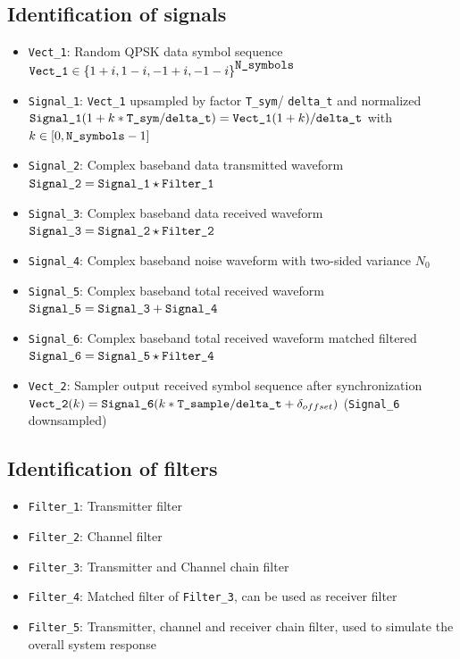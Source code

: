 \documentclass[a4paper]{article}
\begin{document}
\subsection{Identification of signals}
\begin{itemize}
  	\item \verb|Vect_1|: Random QPSK data symbol sequence\\ 
  $	\verb|Vect_1| \in {\{1+i, 1-i, -1+i, -1-i\}}^{\verb|N_symbols|} $
  	\item \verb|Signal_1|: \verb|Vect_1| upsampled by factor \verb|T_sym|/ \verb|delta_t| and normalized\\
  	$\verb|Signal_1|(1+k*\verb|T_sym|/ \verb|delta_t|)=\verb|Vect_1|(1+k)/ \verb|delta_t|$ with $k\in [0, \verb|N_symbols|-1]$
  	\item \verb|Signal_2|: Complex baseband data transmitted waveform\\
  	$\verb|Signal_2|=\verb|Signal_1|\star \verb|Filter_1|$
  	\item \verb|Signal_3|: Complex baseband data received waveform\\
  	$\verb|Signal_3|=\verb|Signal_2|\star \verb|Filter_2|$
  	\item \verb|Signal_4|: Complex baseband noise waveform with two-sided variance $N_0$ 
  	\item \verb|Signal_5|: Complex baseband total received waveform\\
  	$\verb|Signal_5|=\verb|Signal_3| + \verb|Signal_4|$
  	\item \verb|Signal_6|: Complex baseband total received waveform matched filtered\\
  	$\verb|Signal_6|=\verb|Signal_5|\star \verb|Filter_4|$
  	\item \verb|Vect_2|: Sampler output received symbol sequence after synchronization\\
  	$\verb|Vect_2|(k)= \verb|Signal_6|(k*\verb|T_sample|/ \verb|delta_t|+\delta_{offset})$ (\verb|Signal_6| downsampled)
\end{itemize}

\subsection{Identification of filters}
\begin{itemize}
	\item \verb|Filter_1|: Transmitter filter
	\item \verb|Filter_2|: Channel filter
	\item \verb|Filter_3|: Transmitter and Channel chain filter
	\item \verb|Filter_4|: Matched filter of \verb|Filter_3|, can be used as receiver filter
	\item \verb|Filter_5|: Transmitter, channel and receiver chain filter, used to simulate the overall system response
\end{itemize}
\end{document}

